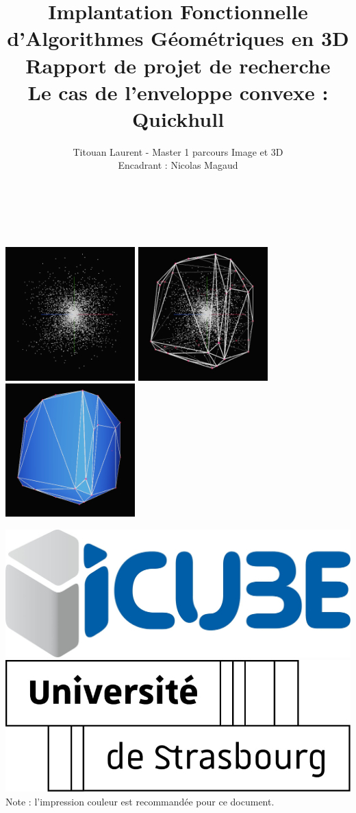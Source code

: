 \documentclass[]{article}
\title{Implantation Fonctionnelle\\d'Algorithmes Géométriques en 3D\\[0.5cm]
  \large Rapport de projet de recherche\\[0.25cm]Le cas de l'enveloppe convexe : Quickhull}
\author{
	Titouan Laurent - Master 1 parcours Image et 3D\\
	Encadrant : Nicolas Magaud
}
\date{}
\begin{document}
\makeatletter
\begin{titlepage}
	\begin{center}
		{\huge \bfseries  \@title }\\[1cm]
		{\large  \@author}\\[2cm]
		\begin{center}
			\includegraphics[width=5cm]{illus/illus0.png}
			\includegraphics[width=5cm]{illus/illus1.png}
			\includegraphics[width=5cm]{illus/illus2.png}
			\\[8cm]
		\end{center}
		\includegraphics[width=0.15\linewidth]{logos/icube.jpg}
		\hspace{1cm}
		\includegraphics[width=0.2\linewidth]{logos/uds.jpg}
		\\[1cm]
		Note : l'impression couleur est recommandée pour ce document.
	\end{center}
\end{titlepage}
\makeatother
\end{document}
